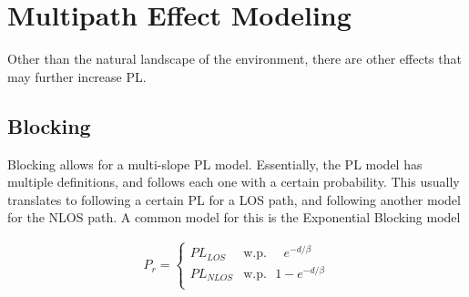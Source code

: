 \documentclass[12pt]{report} %
\begin{document}
\chapter{Multipath Effect Modeling}
Other than the natural landscape of the environment, there are other effects
that may further increase \gls{PL}.

\section{Blocking}
Blocking allows for a multi-slope \gls{PL} model. Essentially, the \gls{PL}
model has multiple definitions, and follows each one with a certain probability.
This usually translates to following a certain \gls{PL} for a \gls{LOS} path,
and following another model for the \gls{NLOS} path. A common model for this is
the Exponential Blocking model

\begin{align}
  \label{eq:exp_blocking}
  P_r = \left\{ \begin{array}{ll}
                  PL_{LOS}  & \text{w.p.} ~~~~~~ e^{-d/\beta}  \\
                  PL_{NLOS} & \text{w.p.} ~~~ 1 - e^{-d/\beta} \\
                \end{array}
  \right.
\end{align}
\end{document}
